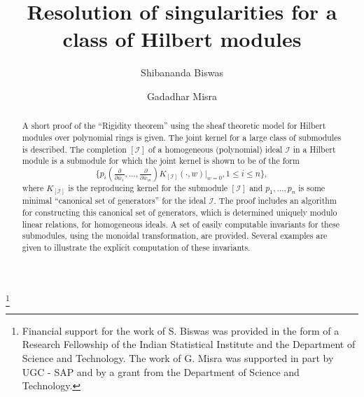 \documentclass[11pt]{amsart}
\date{}
\theoremstyle{definition}
\numberwithin{equation}{section}
\begin{document}
\title[Hilbert modules]{Resolution of singularities for a class of Hilbert modules}

\author[Biswas]{Shibananda Biswas}

\author[Misra]{Gadadhar Misra}
\address[Shibananda Biswas and Gadadhar Misra]{Department of Mathematics, Indian Institute of Science, Banaglore 560012}

 

\thanks{Financial support for the work of S. Biswas was provided in the
form of a Research Fellowship of the Indian Statistical Institute and the
Department of Science and Technology.
The work of G. Misra was  supported in part by UGC - SAP and
by a grant from the Department of Science and Technology.}



\begin{abstract}
A short proof of the ``Rigidity theorem'' using the sheaf theoretic model for Hilbert modules over polynomial rings is given. The joint kernel for a large class of submodules is described. The completion $[\mathcal I]$ of a homogeneous (polynomial) ideal $\mathcal I$ in a Hilbert module is a submodule for which the joint kernel is shown to be of the form
$$
\{p_i(\tfrac{\partial}{\partial \bar{w}_1}, \ldots , \tfrac{\partial}{\partial \bar{w}_m}) K_{[\mathcal I]}(\cdot,w)|_{w=0}, 1 \leq i \leq n\},
$$
where $K_{[\mathcal I]}$ is the reproducing kernel for the submodule $[\mathcal I]$ and $p_1, \ldots , p_n$ is some minimal ``canonical set of  generators'' for the ideal $\mathcal I$.
The proof includes an algorithm for constructing this canonical set of generators,  which is  determined uniquely modulo linear relations, for homogeneous ideals.  A set of easily computable invariants for these
submodules, using the monoidal transformation, are provided.
Several examples are given to illustrate the explicit computation of these invariants.
\end{abstract}

\maketitle
\end{document}
